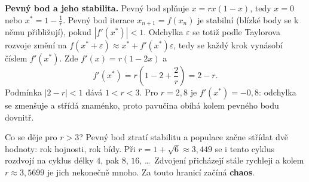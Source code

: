 \begin{example}
  \textbf{Pevný bod a jeho stabilita.} Pevný bod splňuje $x = rx(1 - x)$, tedy $x = 0$ nebo $x^* = 1 - \frac{1}{r}$. Pevný bod iterace $x_{n+1} = f(x_n)$ je stabilní (blízké body se k němu přibližují), pokud $|f'(x^*)| < 1$. Odchylka $\varepsilon$ se totiž podle Taylorova rozvoje změní na $f(x^* + \varepsilon)\approx x^* + f'(x^*)\varepsilon$, tedy se každý krok vynásobí číslem $f'(x^*)$. Zde $f'(x) = r(1 - 2x)$ a
  \begin{equation*}
    f'(x^*) = r\left(1 - 2 + \frac{2}{r}\right) = 2 - r.
  \end{equation*}
  Podmínka $|2 - r| < 1$ dává $1 < r < 3$. Pro $r = 2{,}8$ je $f'(x^*) = -0{,}8$: odchylka se zmenšuje a střídá znaménko, proto pavučina obíhá kolem pevného bodu dovnitř.
\end{example}

Co se děje pro $r > 3$? Pevný bod ztratí stabilitu a populace začne střídat dvě hodnoty: rok hojnosti, rok bídy. Při $r = 1 + \sqrt{6}\approx 3{,}449$ se i tento cyklus rozdvojí na cyklus délky $4$, pak $8$, $16$, \dots\ Zdvojení přicházejí stále rychleji a kolem $r\approx 3{,}5699$ je jich nekonečně mnoho. Za touto hranicí začíná \textbf{chaos}.

